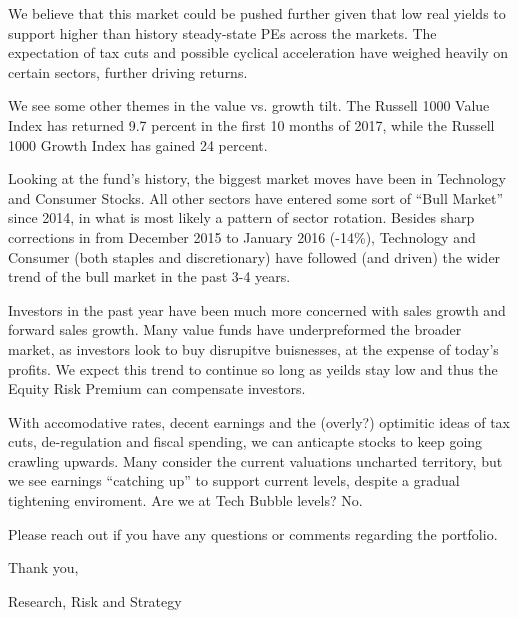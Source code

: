\documentclass[11pt,pressrelease]{newlfm} %
\begin{document}
\begin{newlfm}
\begin{singlespace}
\begin{enumerate}
We believe that this market could be pushed further given that low real yields to support higher than history steady-state PEs across the markets. The expectation of tax cuts and possible cyclical acceleration have weighed heavily on certain sectors, further driving returns. 

We see some other themes in the value vs. growth tilt. The Russell 1000 Value Index has returned 9.7 percent in the first 10 months of 2017, while the Russell 1000 Growth Index has gained 24 percent. 

Looking at the fund's history, the biggest market moves have been in Technology and Consumer Stocks. All other sectors have entered some sort of ``Bull Market'' since 2014, in what is most likely a pattern of sector rotation. Besides sharp corrections in from December 2015 to January 2016 (-14\%), Technology and Consumer (both staples and discretionary) have followed (and driven) the wider trend of the bull market in the past 3-4 years. 


Investors in the past year have been much more concerned with sales growth and forward sales growth. Many value funds have underpreformed the broader market, as investors look to buy disrupitve buisnesses,  at the expense of today's profits. We expect this trend to continue so long as yeilds stay low and thus the Equity Risk Premium can compensate investors.


With accomodative rates, decent earnings and the (overly?) optimitic ideas of tax cuts, de-regulation and fiscal spending, we can anticapte stocks to keep going crawling upwards. Many consider the current valuations uncharted territory, but we see earnings ``catching up'' to support current levels, despite a gradual tightening enviroment. Are we at Tech Bubble levels? No. 
%

\end{enumerate}
Please reach out if you have any questions or comments regarding the portfolio. 

Thank you, \par

Research, Risk and Strategy


\end{singlespace} %



\end{newlfm}
\end{document}
